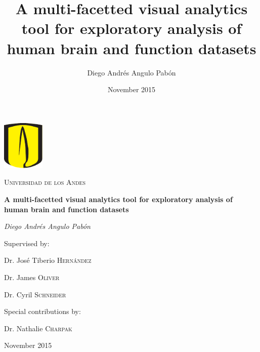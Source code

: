\documentclass[12pt]{report}
\begin{document}
\title{
	{A multi-facetted visual analytics tool for exploratory analysis of human brain and function datasets}\\
}
\author{Diego Andrés Angulo Pabón}
\date{November 2015}



\begin{titlepage}
	\centering
	\includegraphics[width=0.15\textwidth]{uniandes}\par\vspace{1cm}
	{\scshape\LARGE Universidad de los Andes \par}
	\vspace{1cm}
	{\LARGE\bfseries A multi-facetted visual analytics tool for exploratory analysis of human brain and function datasets \par}
	\vspace{2cm}
	{\Large\itshape Diego Andrés Angulo Pabón\par}
	\vfill
	Supervised by:\par
	Dr. José Tiberio \textsc{Hernández} \par
	Dr. James \textsc{Oliver} \par
	Dr. Cyril \textsc{Schneider} \par
	\vspace{1cm}
	Special contributions by: \par
	Dr. Nathalie \textsc{Charpak}\par			
	\vfill
	{\large November 2015}
\end{titlepage}

%
%
%
\end{document}

